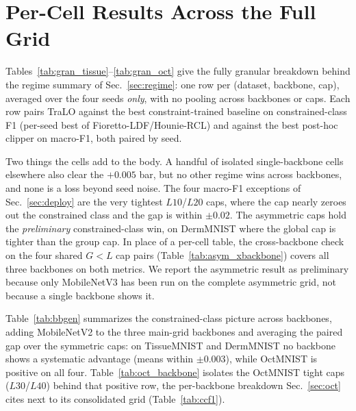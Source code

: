 \documentclass[10pt]{article}
\begin{document}
\section{Per-Cell Results Across the Full Grid}
\label{app:regime}


{}

Tables~\ref{tab:gran_tissue}--\ref{tab:gran_oct} give the fully granular
breakdown behind the regime summary of Sec.~\ref{sec:regime}: one row
per (dataset, backbone, cap), averaged over the four seeds \emph{only},
with no pooling across backbones or caps. Each row pairs TraLO against
the best constraint-trained baseline on constrained-class F1 (per-seed
best of Fioretto-LDF/Hounie-RCL) and against the best post-hoc clipper
on macro-F1, both paired by seed.

{Two things the cells add to the body.
A handful of} isolated single-backbone cells elsewhere also
clear the $+0.005$ bar, but no other regime wins across backbones, and
none is a loss beyond seed noise. {The four macro-F1 exceptions of
Sec.~\ref{sec:deploy} are the very tightest $L10$/$L20$ caps, where the cap
nearly zeroes out the constrained class and the gap} is within $\pm0.02$. The asymmetric caps
 hold the \emph{preliminary}
constrained-class win, on DermMNIST where the global cap is tighter
than the group cap. {In place of a per-cell
table, the} cross-backbone check on the
four shared $G{<}L$ cap pairs (Table~\ref{tab:asym_xbackbone}) {covers all three
backbones on both metrics.}{}{} We report the
asymmetric result as preliminary because only MobileNetV3 has been run
on the complete asymmetric grid, not because a single backbone shows it.

Table~\ref{tab:bbgen} summarizes the constrained-class picture across
backbones, adding MobileNetV2 to the three main-grid backbones and
averaging the paired gap over the symmetric caps: on TissueMNIST and
DermMNIST no backbone shows a systematic advantage (means within
$\pm0.003$), while OctMNIST is positive on all four. Table~\ref{tab:oct_backbone} isolates the OctMNIST
tight caps ($L30$/$L40$) behind that positive row{, the per-backbone breakdown
Sec.~\ref{sec:oct} cites next to its consolidated grid
(Table~\ref{tab:ccf1}).}







{}
\end{document}
